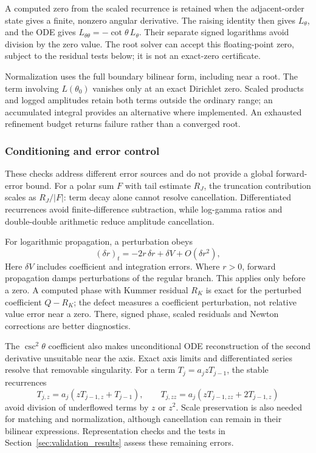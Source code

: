 ﻿\documentclass[11pt,a4paper]{article}
\begin{document}
A computed zero from the scaled recurrence is retained when the adjacent-order state gives a finite, nonzero angular derivative. The raising identity then gives $L_\theta$, and the ODE gives $L_{\theta\theta}=-\cot\theta\,L_\theta$. Their separate signed logarithms avoid division by the zero value. The root solver can accept this floating-point zero, subject to the residual tests below; it is not an exact-zero certificate.

Normalization uses the full boundary bilinear form, including near a root. The term involving $L(\theta_0)$ vanishes only at an exact Dirichlet zero. Scaled products and logged amplitudes retain both terms outside the ordinary range; an accumulated integral provides an alternative where implemented. An exhausted refinement budget returns failure rather than a converged root.

\subsubsection{Conditioning and error control}

These checks address different error sources and do not provide a global forward-error bound. For a polar sum $F$ with tail estimate $R_J$, the truncation contribution scales as $R_J/|F|$: term decay alone cannot resolve cancellation. Differentiated recurrences avoid finite-difference subtraction, while log-gamma ratios and double-double arithmetic reduce amplitude cancellation.

For logarithmic propagation, a perturbation obeys
\begin{equation}
 (\delta r)_t=-2r\,\delta r+\delta V+O(\delta r^2),
 \label{eq:legendre_riccati_error}
\end{equation}
Here $\delta V$ includes coefficient and integration errors. Where $r>0$, forward propagation damps perturbations of the regular branch. This applies only before a zero. A computed phase with Kummer residual $R_K$ is exact for the perturbed coefficient $Q-R_K$; the defect measures a coefficient perturbation, not relative value error near a zero. There, signed phase, scaled residuals and Newton corrections are better diagnostics.

The $\csc^2\theta$ coefficient also makes unconditional ODE reconstruction of the second derivative unsuitable near the axis. Exact axis limits and differentiated series resolve that removable singularity. For a term $T_j=a_jzT_{j-1}$, the stable recurrences
\begin{equation}
 T_{j,z}=a_j(zT_{j-1,z}+T_{j-1}),\qquad
 T_{j,zz}=a_j(zT_{j-1,zz}+2T_{j-1,z})
\end{equation}
avoid division of underflowed terms by $z$ or $z^2$. Scale preservation is also needed for matching and normalization, although cancellation can remain in their bilinear expressions. Representation checks and the tests in Section~\ref{sec:validation_results} assess these remaining errors.
\end{document}
